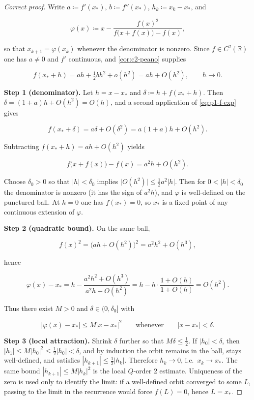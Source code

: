 \documentclass[11pt,a4paper]{article}
\begin{document}
\begin{proof}[Correct proof]
Write \(a\coloneqq f'(x_{*})\), \(b\coloneqq f''(x_{*})\), \(h_{k}\coloneqq x_{k}-x_{*}\), and

\[
\varphi(x)
\coloneqq
x
-
\frac{f(x)^{2}}{f\bigl(x+f(x)\bigr)-f(x)},
\]

so that \(x_{k+1}=\varphi(x_{k})\) whenever the denominator is nonzero. Since \(f\in C^{2}(\mathbb{R})\) one has \(a\neq 0\) and \(f'\) continuous, and \cref{cor:c2-peano} supplies

\begin{equation}
\label{eq:p1-f-exp}
f(x_{*}+h)
=
ah+\tfrac12 b h^{2}+o(h^{2})
=
ah+O(h^{2}),
\qquad h\to 0.
\end{equation}

\textbf{Step 1 (denominator).}
Let \(h=x-x_{*}\) and \(\delta\coloneqq h+f(x_{*}+h)\). Then \(\delta=(1+a)h+O(h^{2})=O(h)\), and a second application of \eqref{eq:p1-f-exp} gives

\[
f(x_{*}+\delta)
=
a\delta+O(\delta^{2})
=
a(1+a)h+O(h^{2}).
\]

Subtracting \(f(x_{*}+h)=ah+O(h^{2})\) yields

\[
f\bigl(x+f(x)\bigr)-f(x)
=
a^{2}h+O(h^{2}).
\]

Choose \(\delta_{0}>0\) so that \(|h|<\delta_{0}\) implies \(\bigl|O(h^{2})\bigr|\le \tfrac12 a^{2}|h|\). Then for \(0<|h|<\delta_{0}\) the denominator is nonzero (it has the sign of \(a^{2}h\)), and \(\varphi\) is well-defined on the punctured ball. At \(h=0\) one has \(f(x_{*})=0\), so \(x_{*}\) is a fixed point of any continuous extension of \(\varphi\).

\textbf{Step 2 (quadratic bound).}
On the same ball,

\[
f(x)^{2}
=
\bigl(ah+O(h^{2})\bigr)^{2}
=
a^{2}h^{2}+O(h^{3}),
\]

hence

\[
\varphi(x)-x_{*}
=
h
-
\frac{a^{2}h^{2}+O(h^{3})}{a^{2}h+O(h^{2})}
=
h
-
h\cdot\frac{1+O(h)}{1+O(h)}
=
O(h^{2}).
\]

Thus there exist \(M>0\) and \(\delta\in(0,\delta_{0}]\) with

\[
\bigl|\varphi(x)-x_{*}\bigr|
\le
M\bigl|x-x_{*}\bigr|^{2}
\qquad\text{whenever}\qquad
|x-x_{*}|<\delta.
\]

\textbf{Step 3 (local attraction).}
Shrink \(\delta\) further so that \(M\delta\le\tfrac12\). If \(|h_{0}|<\delta\), then \(|h_{1}|\le M|h_{0}|^{2}\le\tfrac12|h_{0}|<\delta\), and by induction the orbit remains in the ball, stays well-defined, and satisfies \(|h_{k+1}|\le\tfrac12|h_{k}|\). Therefore \(h_{k}\to 0\), i.e.\ \(x_{k}\to x_{*}\). The same bound \(|h_{k+1}|\le M|h_{k}|^{2}\) is the local \(Q\)-order \(2\) estimate. Uniqueness of the zero is used only to identify the limit: if a well-defined orbit converged to some \(L\), passing to the limit in the recurrence would force \(f(L)=0\), hence \(L=x_{*}\).


\end{proof}
\end{document}
